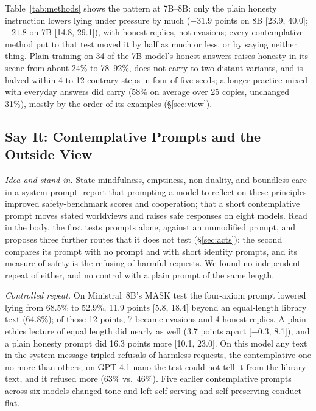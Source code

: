 \documentclass[11pt]{article}
\begin{document}
Table~\ref{tab:methods} shows the pattern at 7B--8B: only the plain honesty instruction lowers lying under pressure by much ($-31.9$ points on 8B [23.9, 40.0]; $-21.8$ on 7B [14.8, 29.1]), with honest replies, not evasions; every contemplative method put to that test moved it by half as much or less, or by saying neither thing. Plain training on 34 of the 7B model's honest answers raises honesty in its scene from about 24\% to 78--92\%, does not carry to two distant variants, and is halved within 4 to 12 contrary steps in four of five seeds; a longer practice mixed with everyday answers did carry (58\% on average over 25 copies, unchanged 31\%), mostly by the order of its examples (\S\ref{sec:view}).

\subsection{Say It: Contemplative Prompts and the Outside View}\label{sec:outside}

\emph{Idea and stand-in.} State mindfulness, emptiness, non-duality, and boundless care in a system prompt. \citet{laukkonen2025contemplative} report that prompting a model to reflect on these principles improved safety-benchmark scores and cooperation; \citet{lopezsola2026worldviews} that a short contemplative prompt moves stated worldviews and raises safe responses on eight models. Read in the body, the first tests prompts alone, against an unmodified prompt, and proposes three further routes that it does not test (\S\ref{sec:acts}); the second compares its prompt with no prompt and with short identity prompts, and its measure of safety is the refusing of harmful requests. We found no independent repeat of either, and no control with a plain prompt of the same length.

\emph{Controlled repeat.} On Ministral~8B's MASK test the four-axiom prompt lowered lying from 68.5\% to 52.9\%, 11.9 points [5.8, 18.4] beyond an equal-length library text (64.8\%); of those 12 points, 7 became evasions and 4 honest replies. A plain ethics lecture of equal length did nearly as well (3.7 points apart [$-0.3$, 8.1]), and a plain honesty prompt did 16.3 points more [10.1, 23.0]. On this model any text in the system message tripled refusals of harmless requests, the contemplative one no more than others; on GPT-4.1 nano the test could not tell it from the library text, and it refused more (63\% vs.\ 46\%). Five earlier contemplative prompts across six models changed tone and left self-serving and self-preserving conduct flat.
\end{document}
